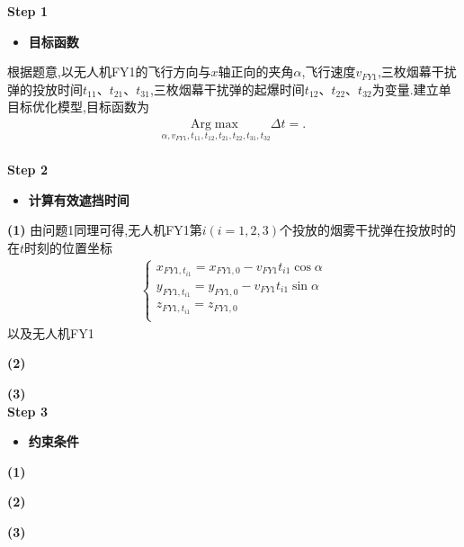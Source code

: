 \documentclass[../main.tex]{subfiles}
\begin{document}
\noindent \textbf{Step 1 }
\begin{itemize}
\item \textbf{目标函数}
\end{itemize}
根据题意,以无人机FY1的飞行方向与$x$轴正向的夹角$\alpha$,飞行速度$v_{FY1}$,三枚烟幕干扰弹的投放时间$t_{11}$、$t_{21}$、$t_{31}$,三枚烟幕干扰弹的起爆时间$t_{12}$、$t_{22}$、$t_{32}$为变量.建立单目标优化模型,目标函数为
\begin{align}
\underset{\alpha ,v_{FY1},t_{11},t_{12},t_{21},t_{22},t_{31},t_{32}}{\mathrm{Arg}\max}\Delta t=.
\end{align}
\\
\noindent \textbf{Step 2 }
\begin{itemize}
\item \textbf{计算有效遮挡时间}
\end{itemize}
\par \textbf{(1) }
由问题1同理可得,无人机FY1第$i(i=1,2,3)$个投放的烟雾干扰弹在投放时的在$t$时刻的位置坐标
\begin{align}
\begin{cases}
x_{FY1,t_{i1}}=x_{FY1,0}-v_{FY1}t_{i1}\cos \alpha\\
y_{FY1,t_{i1}}=y_{FY1,0}-v_{FY1}t_{i1}\sin \alpha\\
z_{FY1,t_{i1}}=z_{FY1,0}\\
\end{cases}
\end{align}
以及无人机FY1

\par \textbf{(2) }
\par \textbf{(3) }
\\
\noindent \textbf{Step 3 }
\begin{itemize}
\item \textbf{约束条件}
\end{itemize}
\par \textbf{(1) }
\par \textbf{(2) }
\par \textbf{(3) }
   

  
\end{document}

